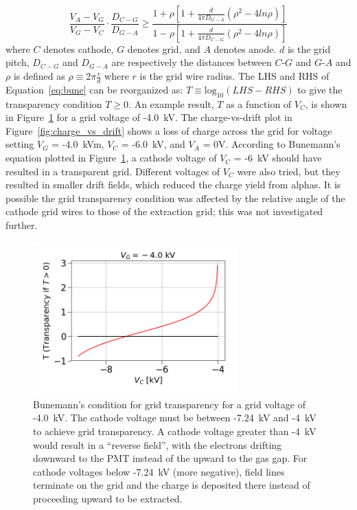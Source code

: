 \begin{equation}
\label{eq:bune}
\frac{V_{A} - V_{G}}{V_{G} - V_{C}} \cdot \frac{D_{C-G}}{D_{G-A}} \geqslant \frac{1 + \rho [1 + \frac{d}{4\pi D_{G-A}} (\rho^{2} - 4 ln\rho) ]} {1 - \rho [1 + \frac{d}{4\pi D_{C-G}} (\rho^{2} - 4 ln\rho) ]}
\end{equation}
where $C$ denotes cathode, $G$ denotes grid, and $A$ denotes anode. $d$ is the grid pitch, $D_{C-G}$ and $D_{G-A}$ are respectively the distances between $C$-$G$ and $G$-$A$ and $\rho$ is defined as $\rho \equiv 2\pi \frac{r}{d}$ where $r$ is the grid wire radius. The \ac{LHS} and \ac{RHS} of Equation~\ref{eq:bune} can be reorganized as: $T \equiv \mathrm{log}_{10}(LHS - RHS)$ to give the transparency condition $T \geqslant 0$. An example result, $T$ as a function of $V_{C}$, is shown in Figure~\ref{fig:bune} for a grid voltage of -4.0~kV. The charge-vs-drift plot in Figure~\ref{fig:charge_vs_drift} shows a loss of charge across the grid for voltage setting $V_{G}$ = -4.0~kVm, $V_{C}$ = -6.0~kV, and $V_{A}$ = 0V. According to Bunemann's equation plotted in Figure~\ref{fig:bune}, a cathode voltage of $V_{C}$ = -6~kV should have resulted in a transparent grid. Different voltages of $V_{C}$ were also tried, but they resulted in smaller drift fields, which reduced the charge yield from alphas. It is possible the grid transparency condition was affected by the relative angle of the cathode grid wires to those of the extraction grid; this was not investigated further.

\begin{figure}[htbp]
\begin{center}
\includegraphics[width=0.7\textwidth]{figures/etrains/bune.png}
\caption{Bunemann's condition for grid transparency for a grid voltage of -4.0~kV. The cathode voltage must be between -7.24~kV and -4~kV to achieve grid transparency. A cathode voltage greater than -4~kV would result in a ``reverse field'', with the electrons drifting downward to the \acs{PMT} instead of the upward to the gas gap. For cathode voltages below -7.24~kV (more negative), field lines terminate on the grid and the charge is deposited there instead of proceeding upward to be extracted.}
\label{fig:bune}
\end{center}
\end{figure}


